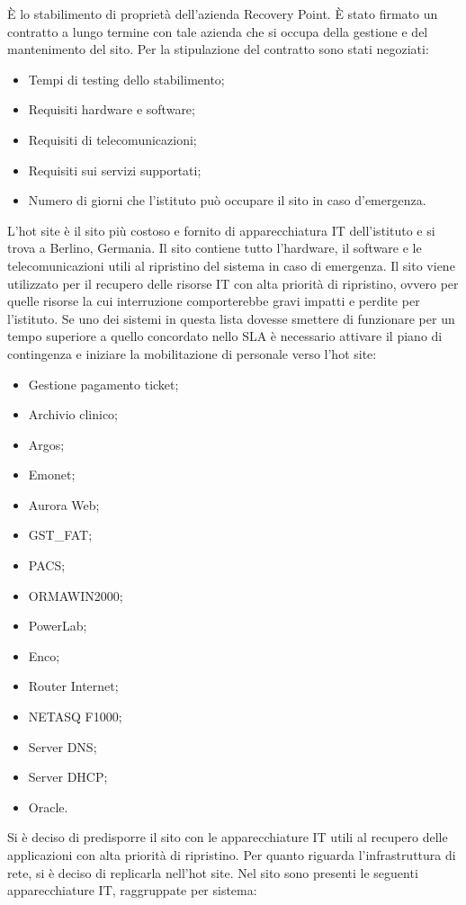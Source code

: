 \documentclass[12pt, a4paper, titlepage]{report}
\newcommand{\hotVendor}{Recovery Point} %
\begin{document}
	È lo stabilimento di proprietà dell'azienda \hotVendor. È stato firmato un contratto a lungo termine con tale azienda che si occupa della gestione e del mantenimento del sito. Per la stipulazione del contratto sono stati negoziati:
	\begin{itemize}
		\item Tempi di testing dello stabilimento;
		\item Requisiti hardware e software;
		\item Requisiti di telecomunicazioni;
		\item Requisiti sui servizi supportati;
		\item Numero di giorni che l'istituto può occupare il sito in caso d'emergenza.
	\end{itemize}
	L'hot site è il sito più costoso e fornito di apparecchiatura IT dell'istituto e si trova a Berlino, Germania. Il sito contiene tutto l'hardware, il software e le telecomunicazioni utili al ripristino del sistema in caso di emergenza. Il sito viene utilizzato per il recupero delle risorse IT con alta priorità di ripristino, ovvero per quelle risorse la cui interruzione comporterebbe gravi impatti e perdite per l'istituto. Se uno dei sistemi in questa lista dovesse smettere di funzionare per un tempo superiore a quello concordato nello SLA è necessario attivare il piano di contingenza e iniziare la mobilitazione di personale verso l'hot site:
	\begin{itemize}
		\item Gestione pagamento ticket;
		\item Archivio clinico;
		\item Argos;
		\item Emonet;
		\item Aurora Web;
		\item GST\_FAT;
		\item PACS;
		\item ORMAWIN2000;
		\item PowerLab;
		\item Enco;
		\item Router Internet;
		\item NETASQ F1000;
		\item Server DNS;
		\item Server DHCP;
		\item Oracle.
	\end{itemize}
	Si è deciso di predisporre il sito con le apparecchiature IT utili al recupero delle applicazioni con alta priorità di ripristino. Per quanto riguarda l'infrastruttura di rete, si è deciso di replicarla nell'hot site. Nel sito sono presenti le seguenti apparecchiature IT, raggruppate per sistema:
\end{document}
